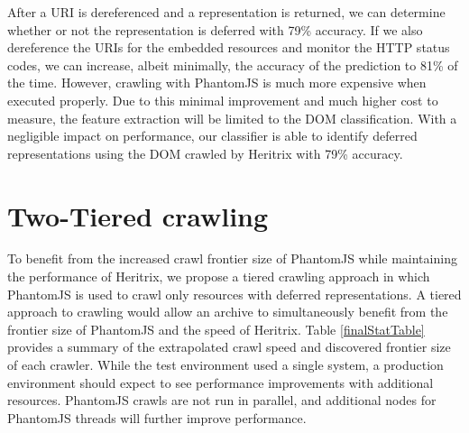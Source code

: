 \documentclass{ipres_proc_article-sp}
\begin{document}
After a URI is dereferenced and a representation is returned, we can determine whether or not the representation is deferred with 79\% accuracy. If we also dereference the URIs for the embedded resources and monitor the HTTP status codes, we can increase, albeit minimally, the accuracy of the prediction to 81\% of the time. However, crawling with PhantomJS is much more expensive when executed properly. Due to this minimal improvement and much higher cost to measure, the feature extraction will be limited to the DOM classification. With a negligible impact on performance, our classifier is able to identify deferred representations using the DOM crawled by Heritrix with 79\% accuracy.


\section{Two-Tiered crawling}
\label{frame}

To benefit from the increased crawl frontier size of PhantomJS while maintaining the performance of Heritrix, we propose a tiered crawling approach in which PhantomJS is used to crawl only resources with deferred representations. 
A tiered approach to crawling would allow an archive to simultaneously benefit from the frontier size of PhantomJS and the speed of Heritrix. 
Table \ref{finalStatTable} provides a summary of the extrapolated crawl speed and discovered frontier size of each crawler. While the test environment used a single system, a production environment should expect to see performance improvements with additional resources. PhantomJS crawls are not run in parallel, and additional nodes for PhantomJS threads will further improve performance.
\end{document}
